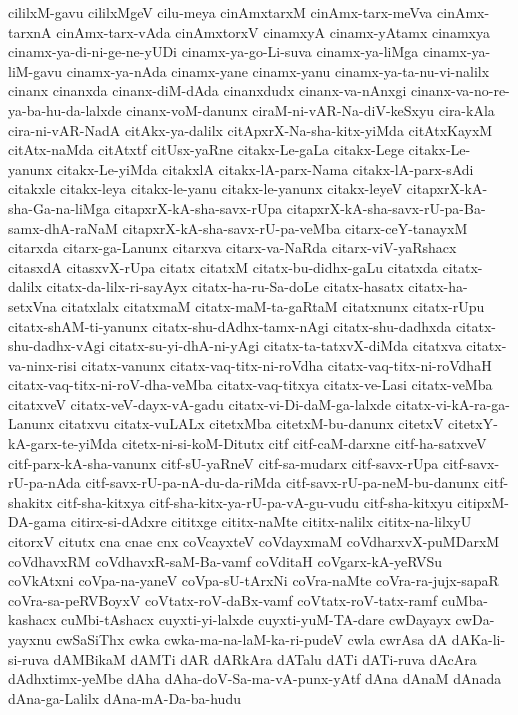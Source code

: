 {cililxM-gavu
cililxMgeV
cilu-meya
cinAmxtarxM
cinAmx-tarx-meVva
cinAmx-tarxnA
cinAmx-tarx-vAda
cinAmxtorxV
cinamxyA
cinamx-yAtamx
cinamxya
cinamx-ya-di-ni-ge-ne-yUDi
cinamx-ya-go-Li-suva
cinamx-ya-liMga
cinamx-ya-liM-gavu
cinamx-ya-nAda
cinamx-yane
cinamx-yanu
cinamx-ya-ta-nu-vi-nalilx
cinanx
cinanxda
cinanx-diM-dAda
cinanxdudx
cinanx-va-nAnxgi
cinanx-va-no-re-ya-ba-hu-da-lalxde
cinanx-voM-danunx
ciraM-ni-vAR-Na-diV-keSxyu
cira-kAla
cira-ni-vAR-NadA
citAkx-ya-dalilx
citApxrX-Na-sha-kitx-yiMda
citAtxKayxM
citAtx-naMda
citAtxtf
citUsx-yaRne
citakx-Le-gaLa
citakx-Lege
citakx-Le-yanunx
citakx-Le-yiMda
citakxlA
citakx-lA-parx-Nama
citakx-lA-parx-sAdi
citakxle
citakx-leya
citakx-le-yanu
citakx-le-yanunx
citakx-leyeV
citapxrX-kA-sha-Ga-na-liMga
citapxrX-kA-sha-savx-rUpa
citapxrX-kA-sha-savx-rU-pa-Ba-samx-dhA-raNaM
citapxrX-kA-sha-savx-rU-pa-veMba
citarx-ceY-tanayxM
citarxda
citarx-ga-Lanunx
citarxva
citarx-va-NaRda
citarx-viV-yaRshacx
citasxdA
citasxvX-rUpa
citatx
citatxM
citatx-bu-didhx-gaLu
citatxda
citatx-dalilx
citatx-da-lilx-ri-sayAyx
citatx-ha-ru-Sa-doLe
citatx-hasatx
citatx-ha-setxVna
citatxlalx
citatxmaM
citatx-maM-ta-gaRtaM
citatxnunx
citatx-rUpu
citatx-shAM-ti-yanunx
citatx-shu-dAdhx-tamx-nAgi
citatx-shu-dadhxda
citatx-shu-dadhx-vAgi
citatx-su-yi-dhA-ni-yAgi
citatx-ta-tatxvX-diMda
citatxva
citatx-va-ninx-risi
citatx-vanunx
citatx-vaq-titx-ni-roVdha
citatx-vaq-titx-ni-roVdhaH
citatx-vaq-titx-ni-roV-dha-veMba
citatx-vaq-titxya
citatx-ve-Lasi
citatx-veMba
citatxveV
citatx-veV-dayx-vA-gadu
citatx-vi-Di-daM-ga-lalxde
citatx-vi-kA-ra-ga-Lanunx
citatxvu
citatx-vuLALx
citetxMba
citetxM-bu-danunx
citetxV
citetxY-kA-garx-te-yiMda
citetx-ni-si-koM-Ditutx
citf
citf-caM-darxne
citf-ha-satxveV
citf-parx-kA-sha-vanunx
citf-sU-yaRneV
citf-sa-mudarx
citf-savx-rUpa
citf-savx-rU-pa-nAda
citf-savx-rU-pa-nA-du-da-riMda
citf-savx-rU-pa-neM-bu-danunx
citf-shakitx
citf-sha-kitxya
citf-sha-kitx-ya-rU-pa-vA-gu-vudu
citf-sha-kitxyu
citipxM-DA-gama
citirx-si-dAdxre
cititxge
cititx-naMte
cititx-nalilx
cititx-na-lilxyU
citorxV
citutx
cna
cnae
cnx
coVcayxteV
coVdayxmaM
coVdharxvX-puMDarxM
coVdhavxRM
coVdhavxR-saM-Ba-vamf
coVditaH
coVgarx-kA-yeRVSu
coVkAtxni
coVpa-na-yaneV
coVpa-sU-tArxNi
coVra-naMte
coVra-ra-jujx-sapaR
coVra-sa-peRVBoyxV
coVtatx-roV-daBx-vamf
coVtatx-roV-tatx-ramf
cuMba-kashacx
cuMbi-tAshacx
cuyxti-yi-lalxde
cuyxti-yuM-TA-dare
cwDayayx
cwDa-yayxnu
cwSaSiThx
cwka
cwka-ma-na-laM-ka-ri-pudeV
cwla
cwrAsa
dA
dAKa-li-si-ruva
dAMBikaM
dAMTi
dAR
dARkAra
dATalu
dATi
dATi-ruva
dAcAra
dAdhxtimx-yeMbe
dAha
dAha-doV-Sa-ma-vA-punx-yAtf
dAna
dAnaM
dAnada
dAna-ga-Lalilx
dAna-mA-Da-ba-hudu
}
